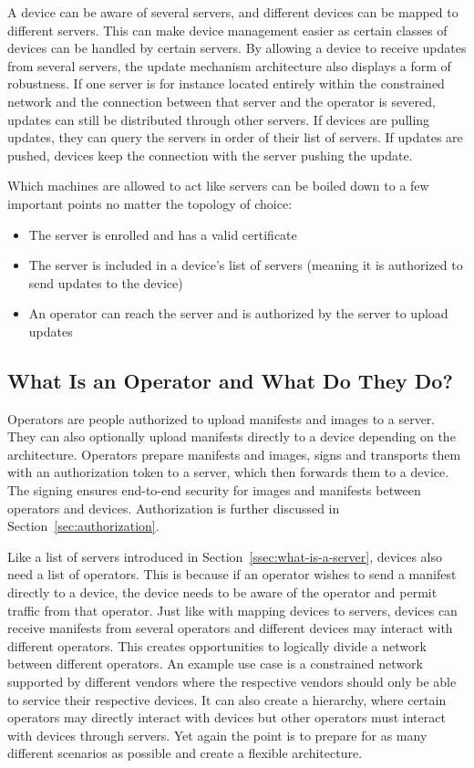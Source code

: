 \documentclass[0-thesis.tex]{subfiles}
\begin{document}
A device can be aware of several servers, and different devices can be mapped to different
servers. This can make device management easier as certain classes of devices can be
handled by certain servers. By allowing a device to receive updates from several servers,
the update mechanism architecture also displays a form of robustness. If one server is for
instance located entirely within the constrained network and the connection between that
server and the operator is severed, updates can still be distributed through other
servers. If devices are pulling updates, they can query the servers in order of their list
of servers. If updates are pushed, devices keep the connection with the server pushing the
update.

Which machines are allowed to act like servers can be boiled down to a few important
points no matter the topology of choice:

\begin{itemize}
    \item The server is enrolled and has a valid certificate
    \item The server is included in a device's list of servers (meaning it is authorized to
            send updates to the device)
    \item An operator can reach the server and is authorized by the server to upload
            updates
\end{itemize}

\subsection{What Is an Operator and What Do They Do?}
\label{ssec:what-is-an-operator}
Operators are people authorized to upload manifests and images to a server. They can also
optionally upload manifests directly to a device depending on the architecture. Operators
prepare manifests and images, signs and transports them with an authorization token to a
server, which then forwards them to a device. The signing ensures end-to-end security for
images and manifests between operators and devices. Authorization is further discussed in
Section~\ref{sec:authorization}.

Like a list of servers introduced in Section~\ref{ssec:what-is-a-server}, devices also
need a list of operators. This is because if an operator wishes to send a manifest
directly to a device, the device needs to be aware of the operator and permit traffic from
that operator. Just like with mapping devices to servers, devices can receive manifests
from several operators and different devices may interact with different operators. This
creates opportunities to logically divide a network between different operators. An
example use case is a constrained network supported by different vendors where the
respective vendors should only be able to service their respective devices. It can also
create a hierarchy, where certain operators may directly interact with devices but other
operators must interact with devices through servers. Yet again the point is to prepare
for as many different scenarios as possible and create a flexible architecture.
\end{document}

